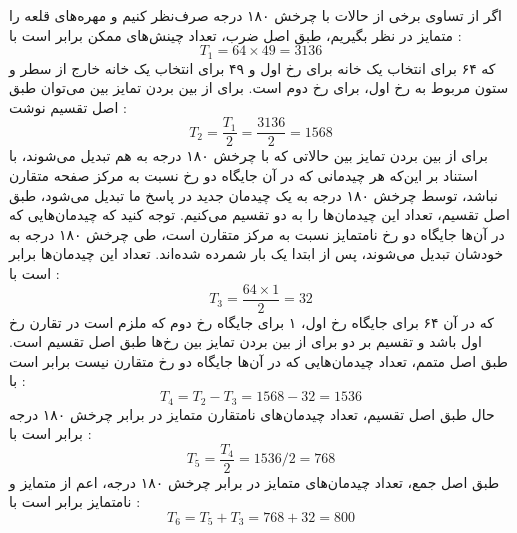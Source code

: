 اگر از تساوی برخی از حالات با چرخش ۱۸۰ درجه صرف‌نظر کنیم و مهره‌های قلعه را متمایز در نظر بگیریم،
طبق اصل ضرب، تعداد چینش‌های ممکن برابر است با :
  $$T_1 = 64 \times 49 = 3136$$
که ۶۴ برای انتخاب یک خانه برای رخ اول و ۴۹ برای انتخاب یک خانه خارج از سطر و ستون
مربوط به رخ اول، برای رخ دوم است. برای از بین بردن تمایز بین می‌توان طبق اصل تقسیم نوشت :
  $$T_2 = \frac{T_1}{2} = \frac{3136}{2} = 1568$$
برای از بین بردن تمایز بین حالاتی که با چرخش ۱۸۰ درجه به هم تبدیل می‌شوند، با استناد بر این‌که
هر چیدمانی که در آن جایگاه دو رخ نسبت به مرکز صفحه متقارن نباشد، توسط چرخش ۱۸۰ درجه به
یک چیدمان جدید در پاسخ ما تبدیل می‌شود، طبق اصل تقسیم، تعداد این چیدمان‌ها را به دو تقسیم می‌کنیم.
توجه کنید که چیدمان‌هایی که در آن‌ها جایگاه دو رخ نامتمایز نسبت به مرکز متقارن است،
طی چرخش ۱۸۰ درجه به خودشان تبدیل می‌شوند، پس از ابتدا یک بار شمرده شده‌اند. تعداد این چیدمان‌ها
برابر است با : 
  $$T_3 = \frac{64 \times 1}{2} = 32$$
که در آن ۶۴ برای جایگاه رخ اول، ۱ برای جایگاه رخ دوم که ملزم است در تقارن رخ اول باشد
و تقسیم بر دو برای از بین بردن تمایز بین رخ‌ها طبق اصل تقسیم است.
طبق اصل متمم، تعداد چیدمان‌هایی که در آن‌ها جایگاه دو رخ متقارن نیست برابر است با :
  $$T_4 = T_2 - T_3 = 1568 - 32 = 1536$$
حال طبق اصل تقسیم، تعداد چیدمان‌های نامتقارن متمایز در برابر چرخش ۱۸۰ درجه برابر است با :
  $$T_5 = \frac{T_4}{2} = 1536 / 2 = 768$$
طبق اصل جمع، تعداد چیدمان‌های متمایز در برابر چرخش ۱۸۰ درجه، اعم از متمایز و نامتمایز برابر است با :
  $$T_6 = T_5 + T_3 = 768 + 32 = 800$$
